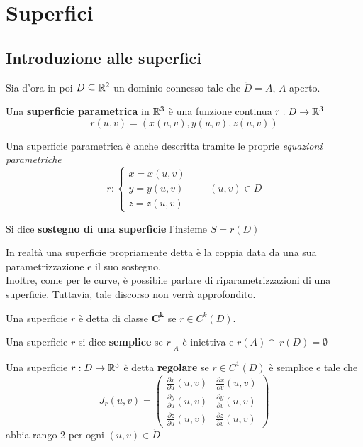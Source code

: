 \chapter{Superfici}
\section{Introduzione alle superfici}
Sia d'ora in poi $D \subseteq \mathbb{R}^2$ un dominio connesso tale che $\mathring{D}=A$, $A$ aperto.
\begin{definition} \label{Def: Superficie parametrica}
    Una \textbf{superficie parametrica} in $\mathbb{R}^3$ è una funzione continua $r: D \to \mathbb{R}^3$ 
    \begin{equation}
        r(u,v)=(x(u,v), y(u,v), z(u,v))
    \end{equation}
\end{definition}
Una superficie parametrica è anche descritta tramite le proprie \textit{equazioni parametriche}
\begin{equation}
    r: \begin{cases}
        x=x(u,v)\\
        y=y(u,v)\\
        z=z(u,v)
    \end{cases}
    \qquad (u,v) \in D
\end{equation}
\begin{definition} \label{Def: Sostegno di una superficie}
    Si dice \textbf{sostegno di una superficie} l'insieme $S=r(D)$
\end{definition}
In realtà una superficie propriamente detta è la coppia data da una sua parametrizzazione e il suo sostegno.\\
Inoltre, come per le curve, è possibile parlare di riparametrizzazioni di una superficie. Tuttavia, tale discorso non verrà approfondito.
\begin{definition} \label{Def: Superficie di classe C^k}
    Una superficie $r$ è detta di classe $\mathbf{C^k}$ se $r \in C^k(D)$.
\end{definition}
\begin{definition} \label{Def: Superficie semplice}
    Una superficie $r$ si dice \textbf{semplice} se $r|_A$ è iniettiva e $r(A) \cap\ r(D)= \emptyset$
\end{definition}
\begin{definition} \label{Def: Superficie regolare}
    Una superficie $r: D \to \mathbb{R}^3$ è detta \textbf{regolare} se $r \in C^1(D)$ è semplice e tale che
    \begin{equation}
        J_r(u,v)= \begin{pmatrix}
            \frac{\partial x}{\partial u}(u,v) & \frac{\partial x}{\partial v}(u,v)\\
            \frac{\partial y}{\partial u}(u,v) & \frac{\partial y}{\partial v}(u,v)\\
            \frac{\partial z}{\partial u}(u,v) & \frac{\partial z}{\partial v}(u,v)
        \end{pmatrix}
    \end{equation}
abbia rango 2 per ogni $(u,v) \in \mathring{D}$
\end{definition}
